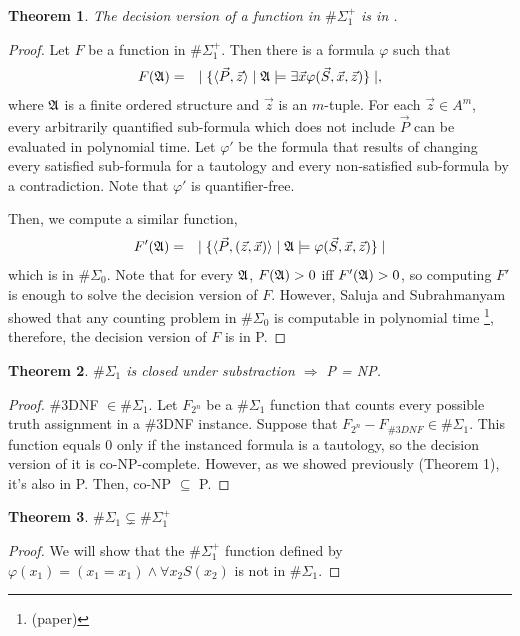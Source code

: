 \documentclass[12pt]{article}
\def\A{{\frak A}}
\def\P{\vec{P}}
\def\S{\vec{S}}
\def\x{\vec{x}}
\def\z{\vec{z}}
\newtheorem{theo}{Theorem}
\begin{document}
\begin{theo}
The decision version of a function in $\#\Sigma_1^{+}$ is in .
\end{theo}
\begin{proof}
Let $F$ be a function in $\#\Sigma_1^{+}$. Then there is a formula $\varphi$ such that
\begin{eqnarray*}
F(\A) &=& \mid \{ \langle\P,\z\rangle \mid \A \models \exists \x \varphi(\S,\x,\z) \} \mid,
\end{eqnarray*}
where $\A$ is a finite ordered structure and $\z$ is an $m$-tuple. For each $\z \in A^m$, every arbitrarily quantified sub-formula which does not include $\P$ can be evaluated in polynomial time. Let $\varphi'$ be the formula that results of changing every satisfied sub-formula for a tautology and every non-satisfied sub-formula by a contradiction. Note that $\varphi'$ is quantifier-free.

Then, we compute a similar function,
\begin{eqnarray*}
F'(\A) &=& \mid \{ \langle\P,(\z,\x)\rangle \mid \A \models \varphi(\S,\x,\z) \} \mid
\end{eqnarray*}
which is in $\#\Sigma_0$. Note that for every $\A$, $F(\A) > 0$ iff $F'(\A) > 0$, so computing $F'$ is enough to solve the decision version of $F$. However, Saluja and Subrahmanyam showed that any counting problem in $\#\Sigma_0$ is computable in polynomial time \footnote[1]{(paper)}, therefore, the decision version of $F$ is in P.
\end{proof}

\begin{theo}
$\#\Sigma_1$ is closed under substraction $\Rightarrow$ P = NP.
\end{theo}
\begin{proof}
\#3DNF $\in \#\Sigma_1$. Let $F_{2^n}$ be a $\#\Sigma_1$ function that counts every possible truth assignment in a \#3DNF instance. Suppose that $F_{2^n}-F_{\#3DNF} \in \#\Sigma_1$. This function equals 0 only if the instanced formula is a tautology, so the decision version of it is co-NP-complete. However, as we showed previously (Theorem 1), it's also in P. Then, co-NP $\subseteq$ P.
\end{proof}

\begin{theo}
$\#\Sigma_1 \subsetneq \#\Sigma_1^{+}$
\end{theo}
\begin{proof}
We will show that the $\#\Sigma_1^{+}$ function defined by $\varphi(x_1) = (x_1 = x_1) \wedge \forall x_2 S(x_2)$ is not in $\#\Sigma_1$.
\end{proof}
\end{document}
